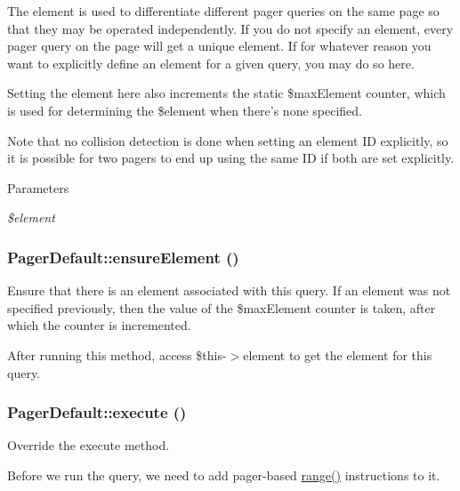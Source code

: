 The element is used to differentiate different pager queries on the same page so that they may be operated independently. If you do not specify an element, every pager query on the page will get a unique element. If for whatever reason you want to explicitly define an element for a given query, you may do so here.

Setting the element here also increments the static \$maxElement counter, which is used for determining the \$element when there's none specified.

Note that no collision detection is done when setting an element ID explicitly, so it is possible for two pagers to end up using the same ID if both are set explicitly.


\begin{DoxyParams}{Parameters}
\item[{\em \$element}]\end{DoxyParams}
\hypertarget{classPagerDefault_a80aec4b474390695eded834e365d1b51}{
\subsubsection[{ensureElement}]{\setlength{\rightskip}{0pt plus 5cm}PagerDefault::ensureElement ()}}
\label{classPagerDefault_a80aec4b474390695eded834e365d1b51}
Ensure that there is an element associated with this query. If an element was not specified previously, then the value of the \$maxElement counter is taken, after which the counter is incremented.

After running this method, access \$this-\/$>$element to get the element for this query. \hypertarget{classPagerDefault_ae92935d692c4a7867132235818c3fe1a}{
\subsubsection[{execute}]{\setlength{\rightskip}{0pt plus 5cm}PagerDefault::execute ()}}
\label{classPagerDefault_ae92935d692c4a7867132235818c3fe1a}
Override the execute method.

Before we run the query, we need to add pager-\/based \hyperlink{classSelectQueryExtender_a83b472a48decf872faf61ded0c576697}{range()} instructions to it. 

